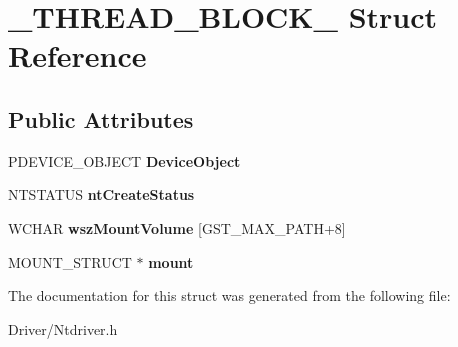 \hypertarget{struct___t_h_r_e_a_d___b_l_o_c_k__}{}\section{\+\_\+\+T\+H\+R\+E\+A\+D\+\_\+\+B\+L\+O\+C\+K\+\_\+ Struct Reference}
\label{struct___t_h_r_e_a_d___b_l_o_c_k__}
\subsection*{Public Attributes}
\begin{DoxyCompactItemize}
\item 
\mbox{\label{struct___t_h_r_e_a_d___b_l_o_c_k___a7a700f6d9f15dddbf2a9b65984823e26}} 
P\+D\+E\+V\+I\+C\+E\+\_\+\+O\+B\+J\+E\+CT {\bfseries Device\+Object}
\item 
\mbox{\label{struct___t_h_r_e_a_d___b_l_o_c_k___a231218ce6862b45833da915f3f44052d}} 
N\+T\+S\+T\+A\+T\+US {\bfseries nt\+Create\+Status}
\item 
\mbox{\label{struct___t_h_r_e_a_d___b_l_o_c_k___a67519de7d896d13de26099034a4f6cd6}} 
W\+C\+H\+AR {\bfseries wsz\+Mount\+Volume} \mbox{[}G\+S\+T\+\_\+\+M\+A\+X\+\_\+\+P\+A\+TH+8\mbox{]}
\item 
\mbox{\label{struct___t_h_r_e_a_d___b_l_o_c_k___a51e9d68838761fdee0a9cee067f2de2b}} 
M\+O\+U\+N\+T\+\_\+\+S\+T\+R\+U\+CT $\ast$ {\bfseries mount}
\end{DoxyCompactItemize}


The documentation for this struct was generated from the following file\+:\begin{DoxyCompactItemize}
\item 
Driver/Ntdriver.\+h\end{DoxyCompactItemize}
